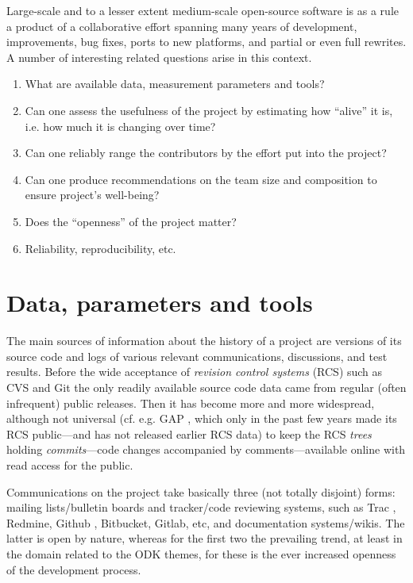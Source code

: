 \documentclass{deliverablereport}
\author{ }
\begin{document}
\maketitle
%
\strut\githubissuedescription
\newpage\tableofcontents\newpage

Large-scale and to a lesser extent medium-scale open-source software 
is as a rule a product of a collaborative effort spanning many years of
development, improvements, bug fixes, ports to new platforms,
and partial or even full rewrites. A number of interesting related questions
arise in this context.
\begin{enumerate}
\item What are available data, measurement parameters and tools?
\item Can one assess the usefulness of the project by estimating
how ``alive'' it is, i.e. how much it is changing over time?
\item Can one reliably range the contributors
by the effort put into the project?
\item Can one produce recommendations on the team size and composition
to ensure project's well-being?
\item Does the ``openness'' of the project matter?
\item Reliability, reproducibility, etc.
\end{enumerate}

\section{Data, parameters and tools}

The main sources of information about the history of a project are versions of
its source code and logs of various relevant communications, discussions, and
test results.  Before the wide acceptance of {\em revision control systems} 
(RCS) \cite{OSullivan:MakingSenseOfRCS} such as  CVS \cite{CVSWeb} and
Git \cite{ChaStr:pg14} the only readily available source code data came from
regular (often infrequent) public releases. Then it has become
more and more widespread, although not universal (cf. e.g. GAP \cite{gap},
which only in the past few years made its RCS 
public---and has not released earlier RCS data)
to keep the RCS {\em trees} holding {\em commits}---code changes
accompanied by comments---available online with read access for the public.

Communications on the project take basically three (not totally disjoint)
forms: mailing lists/bulletin
boards and tracker/code reviewing systems,
such as Trac \cite{wp7:trac}, Redmine, Github \cite{wp7:github},
Bitbucket, Gitlab, etc, and documentation
systems/wikis. The latter is open by nature, whereas for the first two
the prevailing trend, at least in the domain related to the
ODK themes, for these is the ever increased
openness of the development process.
\end{document}
